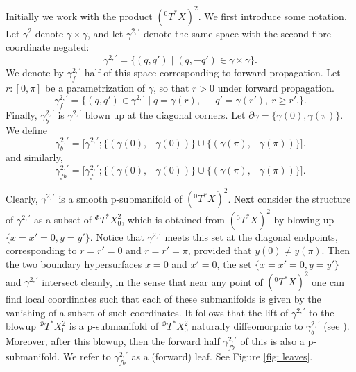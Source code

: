 \documentclass[10pt, a4paper, twoside]{amsart}
\numberwithin{equation}{section}
\theoremstyle{remark}
\begin{document}
Initially we work with the product $({}^0 T^* X)^2$. We first introduce some notation.
Let $\gamma^2$ denote $\gamma \times \gamma$, and let
$\gamma^{2, \prime}$ denote the same space with the second fibre coordinate negated:
\begin{equation}
\gamma^{2,\prime} = \{ (q, q') \mid (q, -q') \in \gamma \times \gamma \}.
\end{equation}
We denote by ${\gamma^{2,\prime}_f}$ half of this space corresponding to forward propagation. Let $r : [0, \pi]$ be a parametrization of $\gamma$, so that $\dot r > 0$ under forward propagation.
\begin{equation}
{\gamma^{2,\prime}_f} = \{ (q, q') \in \gamma^{2,\prime} \mid q = \gamma(r), \ -q' = \gamma(r'), \ r \geq r' . \}.
\end{equation}
Finally, ${\gamma^{2,\prime}_b}$ is $\gamma^{2,\prime}$ blown up at the diagonal corners. Let $\partial \gamma = \{ \gamma(0), \gamma(\pi) \}$. We define
\begin{equation}
{\gamma^{2,\prime}_b} = \big[ \gamma^{2,\prime}; \{ (\gamma(0), -\gamma(0)) \} \cup \{ (\gamma(\pi), -\gamma(\pi)) \} \big].
\end{equation}
and similarly,
\begin{equation}
{\gamma^{2,\prime}_{fb}} = \big[ {\gamma^{2,\prime}_f}; \{ (\gamma(0), -\gamma(0)) \} \cup \{ (\gamma(\pi), -\gamma(\pi))  \} \big].
\end{equation}

Clearly, $\gamma^{2,\prime}$ is a smooth p-submanifold  of $({}^0 T^* X)^2$. Next consider the structure of $\gamma^{2,\prime}$ as a subset of ${}^\Phi T^* X^2_0$, which is obtained from $({}^0 T^* X)^2$ by blowing up $\{ x = x' = 0, y = y' \}$. Notice that $\gamma^{2, \prime}$ meets this set at the diagonal endpoints, corresponding to $r=r'=0$ and $r=r'=\pi$, provided that $y(0) \neq y(\pi)$. 
Then the two boundary hypersurfaces $x=0$ and $x' = 0$, the set $\{ x = x' = 0, y = y' \}$ and $\gamma^{2,\prime}$ intersect cleanly, in the sense that near any point of $({}^0 T^* X)^2$ one can find local coordinates such that each of these submanifolds is given by the vanishing of a subset of such coordinates. It follows that the lift of $\gamma^{2,\prime}$ to the blowup ${}^\Phi T^* X^2_0$ is a p-submanifold of ${}^\Phi T^* X^2_0$ naturally diffeomorphic to ${\gamma^{2,\prime}_b}$ (see \cite[Proposition 5.7.2]{DiffAnal}). Moreover, after this blowup, then the forward half ${\gamma^{2,\prime}_{fb}}$ of this is also a p-submanifold. We refer to ${\gamma^{2,\prime}_{fb}}$ as a (forward) leaf. See Figure \ref{fig: leaves}.
\end{document}
